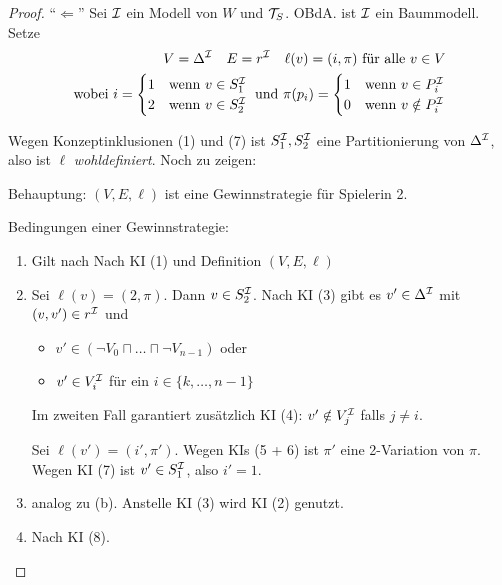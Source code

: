 \begin{proof}
    \enquote{$\Leftarrow$} Sei $\mathcal{I}$ ein Modell von $W$ und $\mathcal{T}_S$. OBdA. ist $\mathcal{I}$ ein Baummodell. Setze
    \begin{align*}
    V = \Delta^{\mathcal{I}} \quad E = r^{\mathcal{I}} \quad \ell(v) = (i, \pi) \text{ für alle } v \in V\\
    \text{wobei } i = \begin{cases}
        1 & \text{wenn } v \in S_1^{\mathcal{I}}\\
        2 & \text{wenn } v \in S_2^{\mathcal{I}}
    \end{cases}
    \text{ und }
    \pi(p_i) = \begin{cases}
        1 & \text{wenn } v \in P_i^{\mathcal{I}}\\
        0 & \text{wenn } v \notin P_i^{\mathcal{I}}
    \end{cases}
    \end{align*}

    Wegen Konzeptinklusionen (1) und (7) ist $S_1^{\mathcal{I}}, S_2^{\mathcal{I}}$ eine Partitionierung von $\Delta^{\mathcal{I}}$, also ist $\ell$ \emph{wohldefiniert}.
    Noch zu zeigen:

    Behauptung: $(V, E, \ell)$ ist eine Gewinnstrategie für Spielerin 2.

    \begin{tafel}
        Bedingungen einer Gewinnstrategie:
        \begin{enumerate}[label={(\alph*)}]
            \item Gilt nach Nach KI (1) und Definition $(V, E, \ell)$
            \item Sei $\ell(v) = (2, \pi)$. Dann $v \in S_2^{\mathcal{I}}$. Nach KI (3) gibt es $v' \in \Delta^{\mathcal{I}}$ mit $(v, v') \in r^{\mathcal{I}}$ und 
                \begin{itemize}
                    \item $v' \in  (\neg V_0 \sqcap \dots \sqcap \neg V_{n - 1})$ oder
                    \item $v' \in V_i^{\mathcal{I}}$ für ein $i \in \{k, \ldots, n - 1\}$
                \end{itemize}
                Im zweiten Fall garantiert zusätzlich KI (4): $v' \notin V_j^{\mathcal{I}}$ falls $j \neq i$.

                Sei $\ell(v') = (i', \pi')$. Wegen KIs (5 + 6) ist $\pi'$ eine 2-Variation von $\pi$. Wegen KI (7) ist $v' \in S_1^{\mathcal{I}}$, also $i' = 1$.
            \item analog zu (b). Anstelle KI (3) wird KI (2) genutzt.
            \item Nach KI (8).
        \end{enumerate}
    \end{tafel}
\end{proof}


